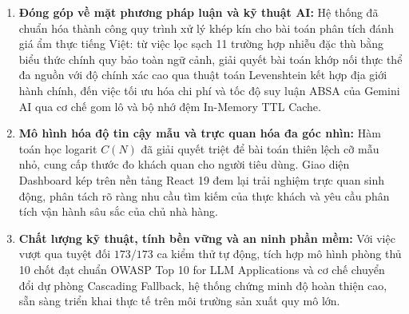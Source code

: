 \documentclass[12pt, a4paper]{article}
\begin{document}
\begin{enumerate}[leftmargin=1.2cm]
    \item \textbf{Đóng góp về mặt phương pháp luận và kỹ thuật AI:} 
    Hệ thống đã chuẩn hóa thành công quy trình xử lý khép kín cho bài toán phân tích đánh giá ẩm thực tiếng Việt: từ việc lọc sạch 11 trường hợp nhiễu đặc thù bằng biểu thức chính quy bảo toàn ngữ cảnh, giải quyết bài toán khớp nối thực thể đa nguồn với độ chính xác cao qua thuật toán Levenshtein kết hợp địa giới hành chính, đến việc tối ưu hóa chi phí và tốc độ suy luận ABSA của Gemini AI qua cơ chế gom lô và bộ nhớ đệm In-Memory TTL Cache.

    \item \textbf{Mô hình hóa độ tin cậy mẫu và trực quan hóa đa góc nhìn:} 
    Hàm toán học logarit $C(N)$ đã giải quyết triệt để bài toán thiên lệch cỡ mẫu nhỏ, cung cấp thước đo khách quan cho người tiêu dùng. Giao diện Dashboard kép trên nền tảng React 19 đem lại trải nghiệm trực quan sinh động, phân tách rõ ràng nhu cầu tìm kiếm của thực khách và yêu cầu phân tích vận hành sâu sắc của chủ nhà hàng.

    \item \textbf{Chất lượng kỹ thuật, tính bền vững và an ninh phần mềm:} 
    Với việc vượt qua tuyệt đối $173/173$ ca kiểm thử tự động, tích hợp mô hình phòng thủ 10 chốt đạt chuẩn OWASP Top 10 for LLM Applications và cơ chế chuyển đổi dự phòng Cascading Fallback, hệ thống chứng minh độ hoàn thiện cao, sẵn sàng triển khai thực tế trên môi trường sản xuất quy mô lớn.
\end{enumerate}
\end{document}
